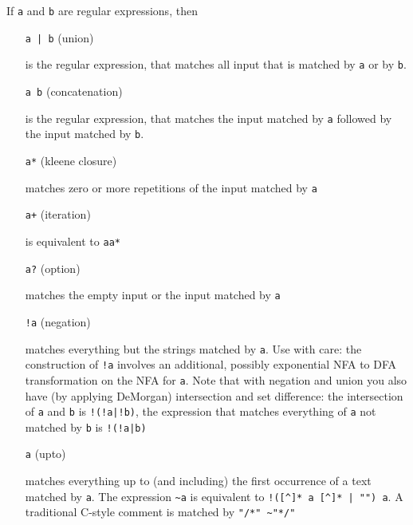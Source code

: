 \documentclass[11pt]{scrartcl}
\begin{document}
    If \texttt{a} and \texttt{b} are regular expressions, then

    \begin{itemize}
     
          \item[\texttt{a | b}] (union) 

            is the regular expression, that matches
            all input that is matched by \texttt{a} or by \texttt{b}.
          
          
          \item[\texttt{a b}] (concatenation) 
            
            is the regular expression,
            that matches the input matched by \texttt{a} followed by the 
            input matched by \texttt{b}.
          
          
          \item[\texttt{a*}] (kleene closure) 

            matches zero or more repetitions
            of the input matched by \texttt{a}
          
          
          \item[\texttt{a+}] (iteration)

          is equivalent to \texttt{aa*}
          
          
          \item[\texttt{a?}] (option)

          matches the empty input or the input matched
            by \texttt{a}

          \item[\texttt{!a}] (negation)

          matches everything but the strings matched by \texttt{a}. 
          Use with care: the construction of \verb+!a+ involves
          an additional, possibly exponential NFA to DFA transformation 
          on the NFA for \texttt{a}. Note that
          with negation and union you also have (by applying DeMorgan)
          intersection and set difference: the intersection of 
          \texttt{a} and \texttt{b} is \verb+!(!a|!b)+, the expression 
          that matches everything of \texttt{a} not matched by \texttt{b} is 
          \verb+!(!a|b)+

          \item[\texttt{\symbol{126}a}] (upto)

          matches everything up to (and including) the first occurrence of a text
          matched by \texttt{a}. The expression \verb-~a- is equivalent
          to \verb-!([^]* a [^]* | "") a-. A traditional C-style comment
          is matched by \verb-"/*" ~"*/"-
          

\end{itemize}
\end{document}
